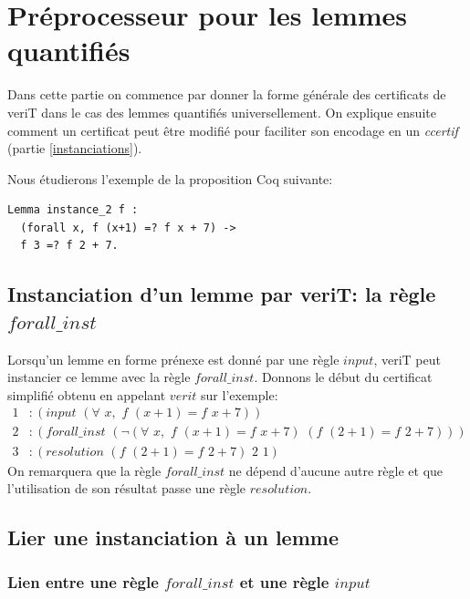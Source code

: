 \documentclass[11pt]{article}
\begin{document}
\section{Préprocesseur pour les lemmes quantifiés}

Dans cette partie on commence par donner la forme générale des certificats de veriT dans le cas des lemmes quantifiés universellement. On explique ensuite comment un certificat peut être modifié pour faciliter son encodage en un \textit{ccertif} (partie \ref{instanciations}).\medbreak

Nous étudierons l'exemple de la proposition Coq suivante: 

\begin{lstlisting}[frame=single]
Lemma instance_2 f : 
  (forall x, f (x+1) =? f x + 7) ->
  f 3 =? f 2 + 7.
\end{lstlisting}


\subsection{Instanciation d'un lemme par veriT: la règle $forall\_inst$}

Lorsqu'un lemme en forme prénexe est donné par une règle $input$, veriT peut instancier ce lemme avec la règle $forall\_inst$. Donnons le début du certificat simplifié obtenu en appelant $verit$ sur l'exemple:
\begin{align*}
1&:(input \,\,(\forall\,\, x,\,\, f\,\, (x+1) = f\,\,x+7)) \\
2&:(forall\_inst \,\,(\neg (\forall\,\, x, \,\,f \,\,(x+1) = f\,\,x+7) \,\,(f \,\,(2+1) = f\,\,2+7)) )\\
3&:(resolution  \,\, (f \,\,(2+1) = f\,\,2+7) \,\,2 \,\,1) 
\end{align*}
On remarquera que la règle $forall\_inst$ ne dépend d'aucune autre règle et que l'utilisation de son résultat passe une règle $resolution$.

\subsection{Lier une instanciation à un lemme} \label{lien}

\subsubsection{Lien entre une règle $forall\_inst$ et une règle $input$} 
\end{document}
